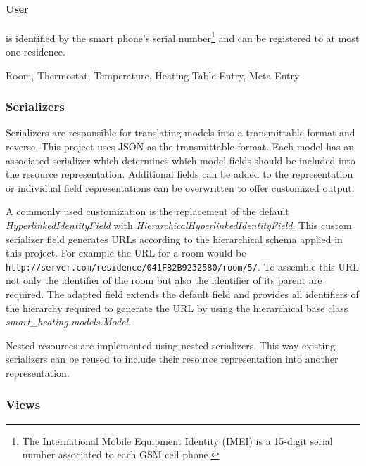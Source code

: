 \paragraph{User}

is identified by the smart phone's serial number\footnote{The International Mobile Equipment Identity (IMEI) is a 15-digit serial number associated to each GSM cell phone.} and can be registered to at most one residence.

Room, Thermostat, Temperature, Heating Table Entry, Meta Entry


\subsubsection{Serializers}
\label{sec:server_infrastructure_serializers}

Serializers are responsible for translating models into a transmittable format and reverse.
This project uses JSON as the transmittable format.
Each model has an associated serializer which determines which model fields should be included into the resource representation.
Additional fields can be added to the representation or individual field representations can be overwritten to offer customized output.

A commonly used customization is the replacement of the default \emph{HyperlinkedIdentityField} with \emph{HierarchicalHyperlinkedIdentityField}.
This custom serializer field generates URLs according to the hierarchical schema applied in this project.
For example the URL for a room would be \nolinkurl{http://server.com/residence/041FB2B9232580/room/5/}.
To assemble this URL not only the identifier of the room but also the identifier of its parent are required.
The adapted field extends the default field and provides all identifiers of the hierarchy required to generate the URL by using the hierarchical base class \emph{smart\_heating.models.Model}.

Nested resources are implemented using nested serializers.
This way existing serializers can be reused to include their resource representation into another representation.


\subsubsection{Views}
\label{sec:server_infrastructure_views}

